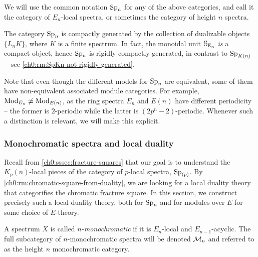 \begin{notation}
    We will use the common notation $\sp\np$ for any of the above categories, and call it the category of $E_n$-local spectra, or sometimes the category of height $n$ spectra.  
\end{notation}

\begin{remark}
    The category $\Sp\np$ is compactly generated by the collection of dualizable objects $\{L_n K\}$, where $K$ is a finite spectrum. In fact, the monoidal unit $\S_{\En}$ \emph{is} a compact object, hence $\Sp\np$ is rigidly compactly generated, in contrast to $\SpK$---see \cref{ch0:rm:SpKn-not-rigidly-generated}.
\end{remark}

\begin{remark}
    Note that even though the different models for $\Sp\np$ are equivalent, some of them have non-equivalent associated module categories. For example, $\Mod_{E_n}\not \simeq \Mod_{E(n)}$, as the ring spectra $E_n$ and $E(n)$ have different periodicity -- the former is $2$-periodic while the latter is $(2p^n-2)$-periodic. Whenever such a distinction is relevant, we will make this explicit. 
\end{remark}





\subsubsection{Monochromatic spectra and local duality}
\label{ch0:sssec:monochromatic-duality}

Recall from \cref{ch0:sssec:fracture-squares} that our goal is to understand the $K_p(n)$-local pieces of the category of $p$-local spectra, $\sp_{(p)}$. By \cref{ch0:rm:chromatic-square-from-duality}, we are looking for a local duality theory that categorifies the chromatic fracture square. In this section, we construct precisely such a local duality theory, both for $\sp\np$ and for modules over $E$ for some choice of $E$-theory. 



\begin{definition}
    \label{ch0:def:monochromatic-spectrum}
    A spectrum $X$ is called \emph{$n$-monochromatic} if it is $E_n$-local and $E_{n-1}$-acyclic. The full subcategory of $n$-monochromatic spectra will be denoted $\M\np$ and referred to as the height $n$ monochromatic category.
\end{definition}

